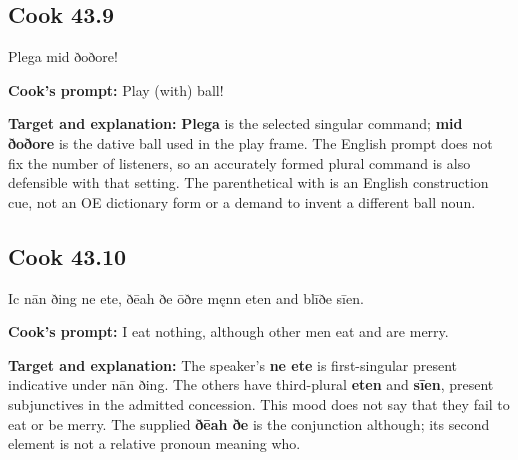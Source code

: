 \par\begin{minipage}{\linewidth}\raggedright
\subsection*{Cook 43.9}

Plega mid ðoðore!

\textbf{Cook's prompt:} Play (with) ball!

\textbf{Target and explanation:} \textbf{Plega} is the selected singular command; \textbf{mid ðoðore} is the dative ball used in the play frame. The English prompt does not fix the number of listeners, so an accurately formed plural command is also defensible with that setting. The parenthetical with is an English construction cue, not an OE dictionary form or a demand to invent a different ball noun.

\end{minipage}\par\addvspace{4pt}

\par\begin{minipage}{\linewidth}\raggedright
\subsection*{Cook 43.10}

Ic nān ðing ne ete, ðēah ðe ōðre męnn eten and blīðe sīen.

\textbf{Cook's prompt:} I eat nothing, although other men eat and are merry.

\textbf{Target and explanation:} The speaker's \textbf{ne ete} is first-singular present indicative under nān ðing. The others have third-plural \textbf{eten} and \textbf{sīen}, present subjunctives in the admitted concession. This mood does not say that they fail to eat or be merry. The supplied \textbf{ðēah ðe} is the conjunction although; its second element is not a relative pronoun meaning who.

\end{minipage}\par\addvspace{4pt}

